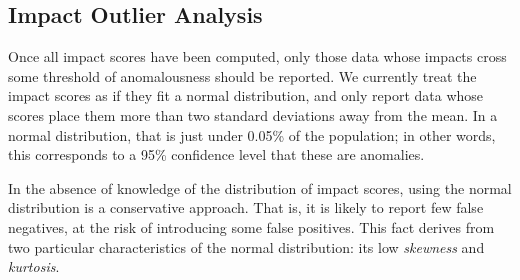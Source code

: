 

\subsection{Impact Outlier Analysis}
\label{sec:outlier_analysis}

Once all impact scores have been computed, only those data whose
impacts cross some threshold of anomalousness should be
reported. We currently treat the impact scores as if they fit a normal
distribution, and only report data whose scores place them more
than two standard deviations away from the mean. In a normal
distribution, that is just under 0.05\% of the population; in other
words, this corresponds to a 95\% confidence level that these are
anomalies.

In the absence of knowledge of the distribution of impact scores, using
the normal distribution is a conservative approach. That is, it
is likely to report few false negatives, at the risk of introducing some false
positives. This fact derives from two particular characteristics of the
normal distribution: its low \emph{skewness} and \emph{kurtosis}.

